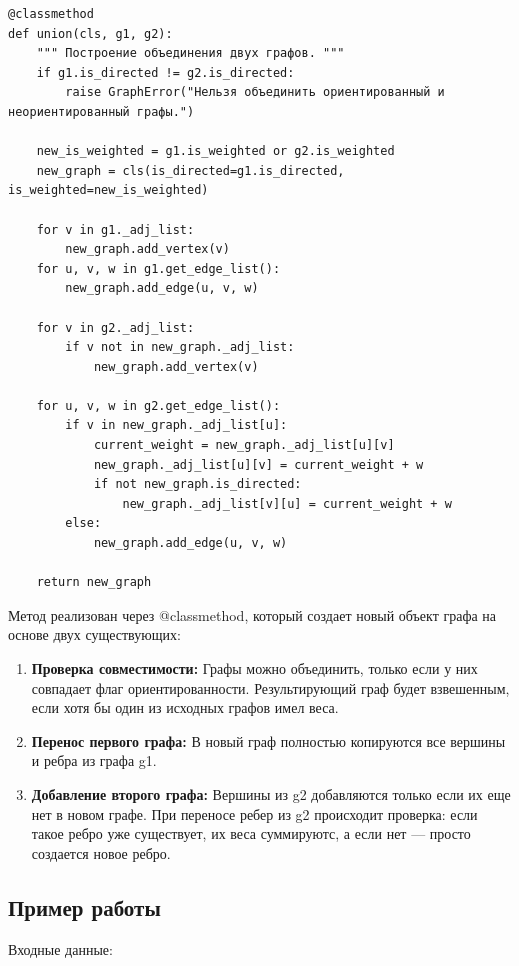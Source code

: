 \documentclass[referat]{SCWorks}
\begin{document}
    \begin{verbatim}
@classmethod
def union(cls, g1, g2):
    """ Построение объединения двух графов. """
    if g1.is_directed != g2.is_directed:
        raise GraphError("Нельзя объединить ориентированный и неориентированный графы.")

    new_is_weighted = g1.is_weighted or g2.is_weighted
    new_graph = cls(is_directed=g1.is_directed, is_weighted=new_is_weighted)

    for v in g1._adj_list:
        new_graph.add_vertex(v)
    for u, v, w in g1.get_edge_list():
        new_graph.add_edge(u, v, w)

    for v in g2._adj_list:
        if v not in new_graph._adj_list:
            new_graph.add_vertex(v)

    for u, v, w in g2.get_edge_list():
        if v in new_graph._adj_list[u]:
            current_weight = new_graph._adj_list[u][v]
            new_graph._adj_list[u][v] = current_weight + w
            if not new_graph.is_directed:
                new_graph._adj_list[v][u] = current_weight + w
        else:
            new_graph.add_edge(u, v, w)

    return new_graph
    \end{verbatim}

    Метод реализован через @classmethod, который создает новый объект графа на основе двух существующих:

    \begin{enumerate}
        \item \textbf{Проверка совместимости:} Графы можно объединить, только если у них совпадает флаг ориентированности. Результирующий граф будет взвешенным, если хотя бы один из исходных графов имел веса.
        \item \textbf{Перенос первого графа:} В новый граф полностью копируются все вершины и ребра из графа g1.
        \item \textbf{Добавление второго графа:} Вершины из g2 добавляются только если их еще нет в новом графе. При переносе ребер из g2 происходит проверка: если такое ребро уже существует, их веса суммируютс, а если нет — просто создается новое ребро.
    \end{enumerate}

    \subsection{Пример работы}

    Входные данные:
\end{document}
